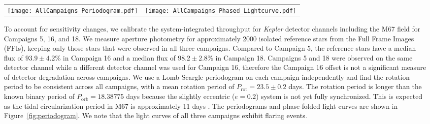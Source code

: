 \documentclass[twocolumn,tighten]{aastex631}
\begin{document}
\begin{figure*}[]
    \centering
    \begin{tabular}{cc}
      \texttt{[image: AllCampaigns\_Periodogram.pdf]}   & \texttt{[image: AllCampaigns\_Phased\_Lightcurve.pdf]}  \\
    \end{tabular}
    \caption{On the right, a Lomb-Scargle periodogram of the light curve of S1063 for each \emph{K2} campaign and on the left, the corresponding phased \emph{K2} light curves. The average period associated with maximum power across all three campaigns is $P_{\mathrm{rot}} = 23.5 \pm 0.2$ days.  }
    \label{fig:periodogram}
\end{figure*}

To account for sensitivity changes, we calibrate the system-integrated throughput for \emph{Kepler} detector channels including the M67 field for Campaigns 5, 16, and 18. We measure aperture photometry for approximately 2000 isolated reference stars from the Full Frame Images (FFIs), keeping only those stars that were observed in all three campaigns. Compared to Campaign 5, the reference stars have a median flux of $93.9\pm4.2\%$ in Campaign 16 and a median flux of $98.2\pm2.8\%$ in Campaign 18. Campaigns 5 and 18 were observed on the same detector channel while a different detector channel was used for Campaign 16, therefore the Campaign 16 offset is not a significant measure of detector degradation across campaigns. We use a Lomb-Scargle periodogram \citep{LombScargle} on each campaign independently and find the rotation period to be consistent across all campaigns, with a mean rotation period of $P_{\mathrm{rot}} = 23.5 \pm 0.2$ days. The rotation period is longer than the known binary period of $P_{\mathrm{orb}} = 18.38775$ days because the slightly eccentric ($e = 0.2$) system is not yet fully synchronized. This is expected as the tidal circularization period in M67 is approximately 11 days \citep{geller2021}. The periodograms and phase-folded light curves are shown in Figure~\ref{fig:periodogram}. We note that the light curves of all three campaigns exhibit flaring events. 

 
\end{document}
